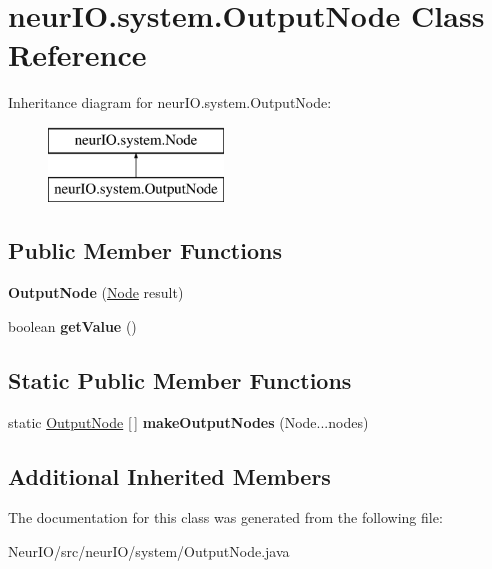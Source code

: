 \hypertarget{classneur_i_o_1_1system_1_1_output_node}{}\section{neur\+I\+O.\+system.\+Output\+Node Class Reference}
\label{classneur_i_o_1_1system_1_1_output_node}
Inheritance diagram for neur\+I\+O.\+system.\+Output\+Node\+:\begin{figure}[H]
\begin{center}
\leavevmode
\includegraphics[height=2.000000cm]{classneur_i_o_1_1system_1_1_output_node}
\end{center}
\end{figure}
\subsection*{Public Member Functions}
\begin{DoxyCompactItemize}
\item 
\mbox{\label{classneur_i_o_1_1system_1_1_output_node_ac4e8788594edf3352bb2037b7e505816}} 
{\bfseries Output\+Node} (\hyperlink{classneur_i_o_1_1system_1_1_node}{Node} result)
\item 
\mbox{\label{classneur_i_o_1_1system_1_1_output_node_ae5d244e5bb2168f66acbca5854fc614c}} 
boolean {\bfseries get\+Value} ()
\end{DoxyCompactItemize}
\subsection*{Static Public Member Functions}
\begin{DoxyCompactItemize}
\item 
\mbox{\label{classneur_i_o_1_1system_1_1_output_node_a7573728315335709ca81071b797f62b8}} 
static \hyperlink{classneur_i_o_1_1system_1_1_output_node}{Output\+Node} \mbox{[}$\,$\mbox{]} {\bfseries make\+Output\+Nodes} (Node...\+nodes)
\end{DoxyCompactItemize}
\subsection*{Additional Inherited Members}


The documentation for this class was generated from the following file\+:\begin{DoxyCompactItemize}
\item 
Neur\+I\+O/src/neur\+I\+O/system/Output\+Node.\+java\end{DoxyCompactItemize}
